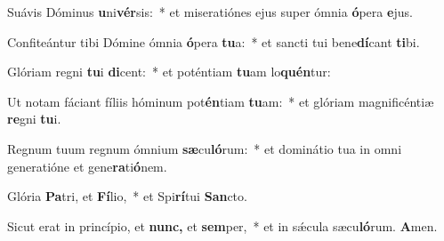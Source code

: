 \item Suávis Dóminus \textbf{u}ni\textbf{vér}sis:~* et miseratiónes ejus super ómnia \textbf{ó}pera \textbf{e}jus.
\item Confiteántur tibi Dómine ómnia \textbf{ó}pera \textbf{tu}a:~* et sancti tui bene\textbf{dí}cant \textbf{ti}bi.
\item Glóriam regni \textbf{tu}i \textbf{di}cent:~* et poténtiam \textbf{tu}am lo\textbf{quén}tur:
\item Ut notam fáciant fíliis hóminum pot\textbf{én}tiam \textbf{tu}am:~* et glóriam magnificéntiæ \textbf{re}gni \textbf{tu}i.
\item Regnum tuum regnum ó\-mnium \textbf{sæ}cu\textbf{ló}rum:~* et dominátio tua in omni generatióne et gene\textbf{ra}ti\textbf{ó}nem.
\item Glória \textbf{Pa}tri, et \textbf{Fí}lio,~* et Spi\textbf{rí}tui \textbf{San}cto.
\item Sicut erat in princípio, et \textbf{nunc,} et \textbf{sem}per,~* et in sǽcula sæcu\textbf{ló}rum. \textbf{A}men.